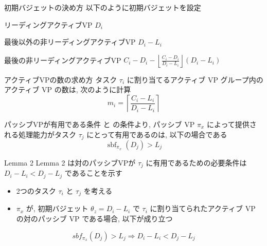 \begin{frame}{初期バジェットの決め方}
    以下のように初期バジェットを設定
    \begin{block}{リーディングアクティブVP}
        $D_i$
    \end{block}
    \begin{block}{最後以外の非リーディングアクティブVP}
        $D_i - L_i$
    \end{block}
    \begin{block}{最後の非リーディングアクティブVP}
        $C_{i}-D_{i}-\left\lfloor\frac{C_{i}-D_{i}}{D_{i}-L_{i}}\right\rfloor\left(D_{i}-L_{i}\right)$
    \end{block}
\end{frame}

\begin{frame}{アクティブVPの数の求め方}
    タスク $\tau_{i}$ に割り当てるアクティブ VP グループ内のアクティブ VP の数は, 次のように計算
    \begin{equation*}
        m_{i}=\left\lceil\frac{C_{i}-L_{i}}{D_{i}-L_{i}}\right\rceil
    \end{equation*}
\end{frame}

\begin{frame}{パッシブVPが有用である条件}
     と  の条件より, パッシブ VP $\pi_{x}$ によって提供される処理能力がタスク $\tau_{j}$ にとって有用であるのは, 以下の場合である
    \begin{equation*}
        \operatorname{sbf}_{\pi_{x}}\left(D_{j}\right)>L_{j}
    \end{equation*}

\end{frame}

\begin{frame}[label=lemma6]{Lemma 2}
    Lemma 2 は対のパッシブVPが $\tau_j$ に有用であるための必要条件は $D_{i}-L_{i}<D_{j}-L_{j}$ であることを示す
    \begin{lemma}[]
        \setlength{\linewidth}{0.98\columnwidth}
        \begin{itemize}
            \item 2つのタスク $\tau_{i}$ と $\tau_{j}$ を考える
            \item $\pi_{x}$ が, 初期バジェット $\theta_{z}=D_{i}-L_{i}$ で $\tau_{i}$ に割り当てられたアクティブ VP の対のパッシブ VP である場合, 以下が成り立つ
        \end{itemize}
        \begin{equation*}
            s b f_{\pi_{x}}\left(D_{j}\right)>L_{j} \Rightarrow D_{i}-L_{i}<D_{j}-L_{j}
        \end{equation*}
    \end{lemma}
\end{frame}

